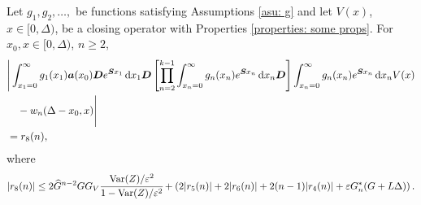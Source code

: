 \begin{cor}\label{cor: ahjg}
	Let \(g_1,g_2,\dots,\) be functions satisfying Assumptions \ref{asu: g} and let \(V(x)\), \(x\in[0,\Delta)\), be a closing operator with Properties \ref{properties: some props}. For \(x_0,x\in\mathcal [0,\Delta)\), \(n\geq 2\), 
	\begin{align}
		&\Bigg| \int_{x_1=0}^\infty g_1(x_1) \boldsymbol a (x_0) \boldsymbol D e^{\boldsymbol{S}x_1}\, \mathrm{d} x_1\boldsymbol D 
            	\left[\prod_{n=2}^{k-1}\int_{x_n=0}^\infty g_n(x_n) e^{\boldsymbol{S}x_n} \, \mathrm{d} x_n
		\boldsymbol D\right]
            	\int_{x_n=0}^\infty g_{n}(x_n) e^{\boldsymbol{S}x_n} \, \mathrm{d} x_n V(x) \nonumber 
		\\&\quad{}- w_n(\Delta - x_0,x) \Bigg| \nonumber
		\\&= r_8(n),
	\end{align}
	where 
	\[|r_8(n)|\leq 2\widehat G^{n-2}GG_V\cfrac{\mathrm{Var}(Z)/\varepsilon^2}{1-\mathrm{Var}(Z)/\varepsilon^2}
		+ \left( 2|r_5(n)| + 2|r_6(n)| + 2(n-1)|r_4(n)| + \varepsilon G_n^{*}(G+L\Delta) \right) .\]
\end{cor}
